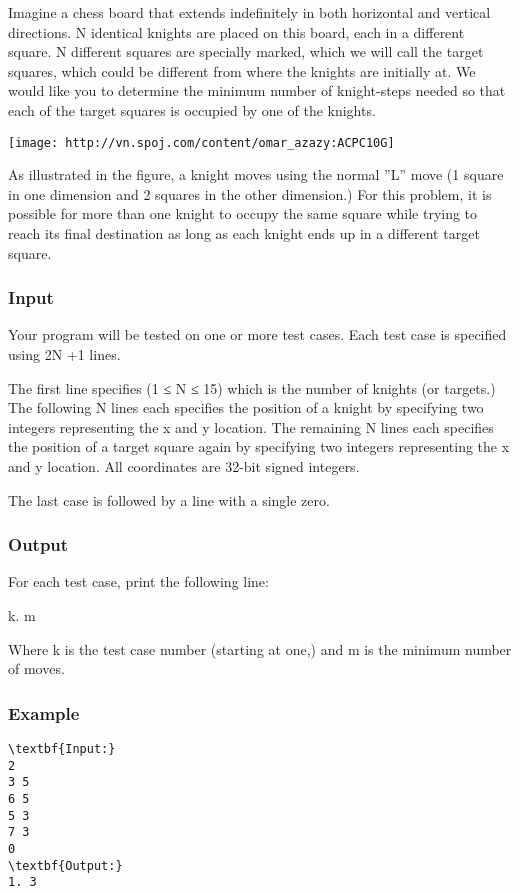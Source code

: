 

Imagine a chess board that extends indefinitely in both horizontal and vertical directions. N identical knights are placed on this board, each in a different square. N different squares are specially marked, which we will call the target squares, which could be different from where the knights are initially at. We would like you to determine the minimum number of knight-steps needed so that each of the target squares is occupied by one of the knights.


\texttt{[image: http://vn.spoj.com/content/omar\_azazy:ACPC10G]}

As illustrated in the figure, a knight moves using the normal ”L” move (1 square in one dimension and 2 squares in the other dimension.) For this problem, it is possible for more than one knight to occupy the same square while trying to reach its final destination as long as each knight ends up in a different target square.

\subsubsection{Input}

Your program will be tested on one or more test cases. Each test case is specified using 2N +1 lines.


The first line specifies (1 ≤ N ≤ 15) which is the number of knights (or targets.) The following N lines each specifies the position of a knight by specifying two integers representing the x and y location. The remaining N lines each specifies the position of a target square again by specifying two integers representing the x and y location. All coordinates are 32-bit signed integers.


The last case is followed by a line with a single zero.

\subsubsection{Output}

For each test case, print the following line:


k. m


Where k is the test case number (starting at one,) and m is the minimum number of moves.

\subsubsection{Example}
\begin{verbatim}
\textbf{Input:}
2
3 5
6 5
5 3
7 3
0
\textbf{Output:}
1. 3\end{verbatim}

